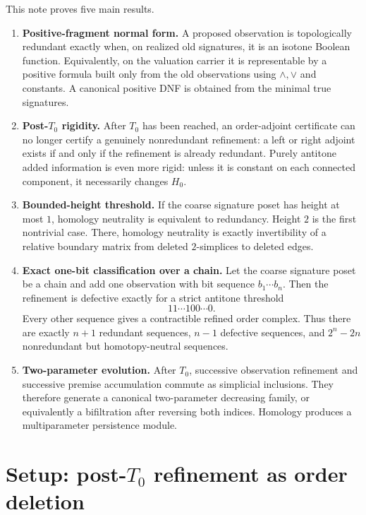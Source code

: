 \documentclass[11pt]{article}
\theoremstyle{definition}
\begin{document}
This note proves five main results.

\begin{enumerate}[label=\textbf{R\arabic*.},leftmargin=2.9em]
\item \textbf{Positive-fragment normal form.} A proposed observation is topologically redundant exactly when, on realized old signatures, it is an isotone Boolean function. Equivalently, on the valuation carrier it is representable by a positive formula built only from the old observations using $\wedge,\vee$ and constants. A canonical positive DNF is obtained from the minimal true signatures.

\item \textbf{Post-$T_0$ rigidity.} After $T_0$ has been reached, an order-adjoint certificate can no longer certify a genuinely nonredundant refinement: a left or right adjoint exists if and only if the refinement is already redundant. Purely antitone added information is even more rigid: unless it is constant on each connected component, it necessarily changes $H_0$.

\item \textbf{Bounded-height threshold.} If the coarse signature poset has height at most $1$, homology neutrality is equivalent to redundancy. Height $2$ is the first nontrivial case. There, homology neutrality is exactly invertibility of a relative boundary matrix from deleted $2$-simplices to deleted edges.

\item \textbf{Exact one-bit classification over a chain.} Let the coarse signature poset be a chain and add one observation with bit sequence $b_1\cdots b_n$. Then the refinement is defective exactly for a strict antitone threshold
\[
11\cdots100\cdots0.
\]
Every other sequence gives a contractible refined order complex. Thus there are exactly $n+1$ redundant sequences, $n-1$ defective sequences, and $2^n-2n$ nonredundant but homotopy-neutral sequences.

\item \textbf{Two-parameter evolution.} After $T_0$, successive observation refinement and successive premise accumulation commute as simplicial inclusions. They therefore generate a canonical two-parameter decreasing family, or equivalently a bifiltration after reversing both indices. Homology produces a multiparameter persistence module.
\end{enumerate}

\section{Setup: post-$T_0$ refinement as order deletion}
\end{document}
